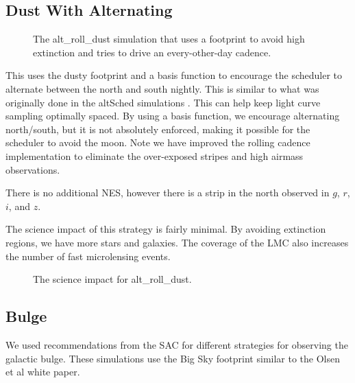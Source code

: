 \subsection{Dust With Alternating}

\begin{figure}
\caption{The alt\_roll\_dust simulation that uses a footprint to avoid high extinction and tries to drive an every-other-day cadence.}\label{fig:altdust}
\end{figure}

This uses the dusty footprint and a basis function to encourage the scheduler to alternate between the north and south nightly. This is similar to what was originally done in the altSched simulations \citep{Rothchild19}. This can help keep light curve sampling optimally spaced. By using a basis function, we encourage alternating north/south, but it is not absolutely enforced, making it possible for the scheduler to avoid the moon. Note we have improved the rolling cadence implementation to eliminate the over-exposed stripes and high airmass observations.

There is no additional NES, however there is a strip in the north observed in $g$, $r$, $i$, and $z$.

The science impact of this strategy is fairly minimal. By avoiding extinction regions, we have more stars and galaxies. The coverage of the LMC also increases the number of fast microlensing events. 

\begin{figure}
\caption{The science impact for alt\_roll\_dust.}
\end{figure}

\subsection{Bulge}

We used recommendations from the SAC for different strategies for observing the galactic bulge. These simulations use the Big Sky footprint similar to the Olsen et al white paper.  

